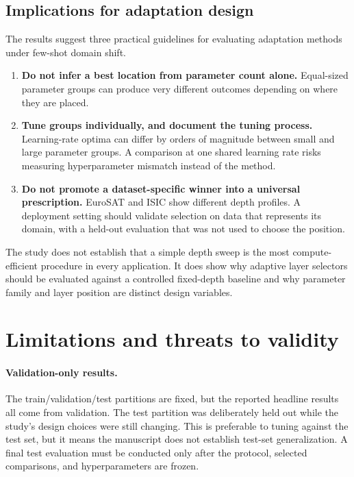 \documentclass[11pt]{article}
\begin{document}
\subsection{Implications for adaptation design}

The results suggest three practical guidelines for evaluating adaptation methods under few-shot domain shift.
\begin{enumerate}
  \item \textbf{Do not infer a best location from parameter count alone.} Equal-sized parameter groups can produce very different outcomes depending on where they are placed.
  \item \textbf{Tune groups individually, and document the tuning process.} Learning-rate optima can differ by orders of magnitude between small and large parameter groups. A comparison at one shared learning rate risks measuring hyperparameter mismatch instead of the method.
  \item \textbf{Do not promote a dataset-specific winner into a universal prescription.} EuroSAT and ISIC show different depth profiles. A deployment setting should validate selection on data that represents its domain, with a held-out evaluation that was not used to choose the position.
\end{enumerate}

The study does not establish that a simple depth sweep is the most compute-efficient procedure in every application. It does show why adaptive layer selectors should be evaluated against a controlled fixed-depth baseline and why parameter family and layer position are distinct design variables.

\section{Limitations and threats to validity}
\label{sec:limitations}

\paragraph{Validation-only results.} The train/validation/test partitions are fixed, but the reported headline results all come from validation. The test partition was deliberately held out while the study's design choices were still changing. This is preferable to tuning against the test set, but it means the manuscript does not establish test-set generalization. A final test evaluation must be conducted only after the protocol, selected comparisons, and hyperparameters are frozen.
\end{document}
